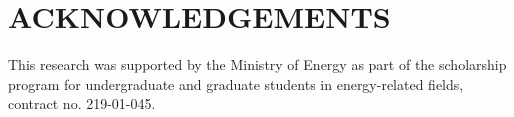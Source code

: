 \documentclass[letterpaper]{mc2021}
\begin{document}

\vspace{-2.5mm}

\section*{ACKNOWLEDGEMENTS}

This research was supported by the Ministry of Energy as part of the scholarship program for undergraduate and graduate students in energy-related fields, contract no. 219-01-045.

\vspace{-2.5mm}

\newif\ifusebibtex
\usebibtextrue

\ifusebibtex
\setlength{\baselineskip}{12pt}


\else
\setlength{\baselineskip}{12pt}
\begin{thebibliography}{300}
\bibitem{journal} B. Author(s), ``Title,'' \emph{Journal Name in Italic}, 
  \textbf{Volume in Bold}, pp. 34-89 (19xx).
\bibitem{proc_paper} C. D. Author(s), ``Article Title,'' \emph{Proceedings of
  Meeting in Italic}, Location, Dates of Meeting, Vol. n, pp. 134-156 
  (19xx).
\bibitem{book} E. F. Author, \emph{Book Title in Italic}, Publisher, City \&
  Country (19xx). 
\bibitem{website} ``Spallation Neutron Source: The next-generation 
  neutron-scattering facility in the United States,'' 
  \url{http://www.sns.gov/documentation/sns\_brochure.pdf} (2002).
\end{thebibliography}
\fi

\end{document}
